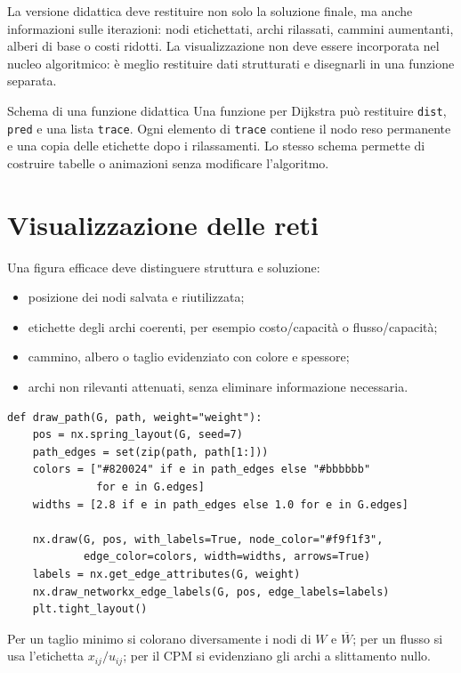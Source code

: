 \documentclass[11pt,a4paper]{article}
\begin{document}
La versione didattica deve restituire non solo la soluzione finale, ma anche informazioni sulle iterazioni: nodi etichettati, archi rilassati, cammini aumentanti, alberi di base o costi ridotti. La visualizzazione non deve essere incorporata nel nucleo algoritmico: è meglio restituire dati strutturati e disegnarli in una funzione separata.

\begin{examplebox}{Schema di una funzione didattica}
Una funzione per Dijkstra può restituire \texttt{dist}, \texttt{pred} e una lista \texttt{trace}. Ogni elemento di \texttt{trace} contiene il nodo reso permanente e una copia delle etichette dopo i rilassamenti. Lo stesso schema permette di costruire tabelle o animazioni senza modificare l'algoritmo.
\end{examplebox}

\section{Visualizzazione delle reti}
Una figura efficace deve distinguere struttura e soluzione:
\begin{itemize}
\item posizione dei nodi salvata e riutilizzata;
\item etichette degli archi coerenti, per esempio costo/capacità o flusso/capacità;
\item cammino, albero o taglio evidenziato con colore e spessore;
\item archi non rilevanti attenuati, senza eliminare informazione necessaria.
\end{itemize}

\begin{lstlisting}[style=python,caption={Evidenziare un cammino}]
def draw_path(G, path, weight="weight"):
    pos = nx.spring_layout(G, seed=7)
    path_edges = set(zip(path, path[1:]))
    colors = ["#820024" if e in path_edges else "#bbbbbb"
              for e in G.edges]
    widths = [2.8 if e in path_edges else 1.0 for e in G.edges]

    nx.draw(G, pos, with_labels=True, node_color="#f9f1f3",
            edge_color=colors, width=widths, arrows=True)
    labels = nx.get_edge_attributes(G, weight)
    nx.draw_networkx_edge_labels(G, pos, edge_labels=labels)
    plt.tight_layout()
\end{lstlisting}

Per un taglio minimo si colorano diversamente i nodi di $W$ e $\overline W$; per un flusso si usa l'etichetta $x_{ij}/u_{ij}$; per il CPM si evidenziano gli archi a slittamento nullo.
\end{document}

